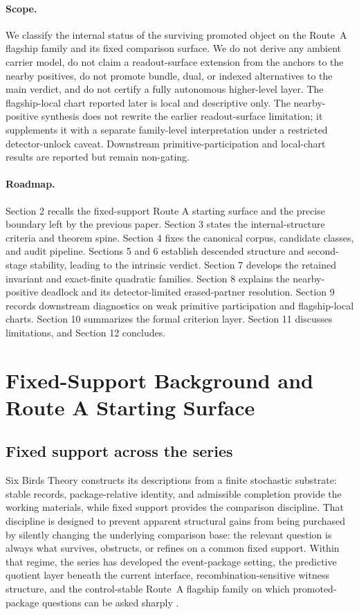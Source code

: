 \documentclass[11pt]{article}
\theoremstyle{definition}
\begin{document}
\paragraph{Scope.}
We classify the internal status of the surviving promoted object on the Route~A flagship family and its fixed comparison surface. We do not derive any ambient carrier model, do not claim a readout-surface extension from the anchors to the nearby positives, do not promote bundle, dual, or indexed alternatives to the main verdict, and do not certify a fully autonomous higher-level layer. The flagship-local chart reported later is local and descriptive only. The nearby-positive synthesis does not rewrite the earlier readout-surface limitation; it supplements it with a separate family-level interpretation under a restricted detector-unlock caveat. Downstream primitive-participation and local-chart results are reported but remain non-gating.

\paragraph{Roadmap.}
Section 2 recalls the fixed-support Route A starting surface and the precise boundary left by the previous paper. Section 3 states the internal-structure criteria and theorem spine. Section 4 fixes the canonical corpus, candidate classes, and audit pipeline. Sections 5 and 6 establish descended structure and second-stage stability, leading to the intrinsic verdict. Section 7 develops the retained invariant and exact-finite quadratic families. Section 8 explains the nearby-positive deadlock and its detector-limited erased-partner resolution. Section 9 records downstream diagnostics on weak primitive participation and flagship-local charts. Section 10 summarizes the formal criterion layer. Section 11 discusses limitations, and Section 12 concludes.
 \section{Fixed-Support Background and Route A Starting Surface}

\subsection{Fixed support across the series}

Six Birds Theory constructs its descriptions from a finite stochastic substrate: stable records, package-relative identity, and admissible completion provide the working materials, while fixed support provides the comparison discipline. That discipline is designed to prevent apparent structural gains from being purchased by silently changing the underlying comparison base: the relevant question is always what survives, obstructs, or refines on a common fixed support. Within that regime, the series has developed the event-package setting, the predictive quotient layer beneath the current interface, recombination-sensitive witness structure, and the control-stable Route~A flagship family on which promoted-package questions can be asked sharply \cite{Tsiokos2026EventPackages,Tsiokos2026PredictiveQuotients,Tsiokos2026MarkingErasure,Tsiokos2026RecombinationWitnesses,Tsiokos2026PromotionCriteria}.
\end{document}
